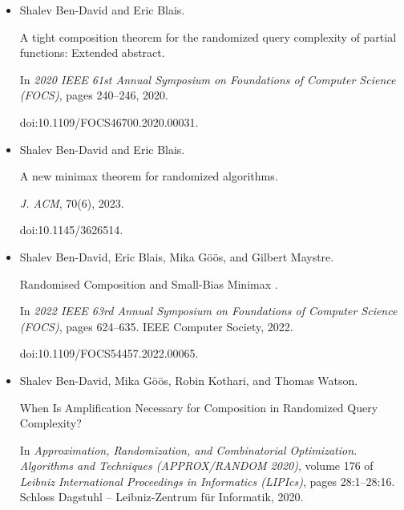 \documentclass[10pt,a4paper]{article}
\begin{document}
\begin{itemize}
In \emph{14th Innovations in Theoretical Computer Science Conference
(ITCS 2023)}, volume 251 of \emph{Leibniz International Proceedings in
Informatics (LIPIcs)}, pages 14:1–14:17. Schloss Dagstuhl – Leibniz-Zentrum
für Informatik, 2023.


doi:10.4230/LIPIcs.ITCS.2023.14.





\item[] 
[6]

Shalev Ben-David and Eric Blais.


A tight composition theorem for the randomized query complexity of
partial functions: Extended abstract.


In \emph{2020 IEEE 61st Annual Symposium on Foundations of Computer
Science (FOCS)}, pages 240–246, 2020.


doi:10.1109/FOCS46700.2020.00031.





\item[] 
[7]

Shalev Ben-David and Eric Blais.


A new minimax theorem for randomized algorithms.


\emph{J. ACM}, 70(6), 2023.


doi:10.1145/3626514.





\item[] 
[8]

Shalev Ben-David, Eric Blais, Mika Göös, and Gilbert Maystre.


 Randomised Composition and Small-Bias Minimax .


In \emph{2022 IEEE 63rd Annual Symposium on Foundations of Computer
Science (FOCS)}, pages 624–635. IEEE Computer Society, 2022.


doi:10.1109/FOCS54457.2022.00065.





\item[] 
[9]

Shalev Ben-David, Mika Göös, Robin Kothari, and Thomas Watson.


When Is Amplification Necessary for Composition in Randomized Query
Complexity?


In \emph{Approximation, Randomization, and Combinatorial Optimization.
Algorithms and Techniques (APPROX/RANDOM 2020)}, volume 176 of \emph{Leibniz
International Proceedings in Informatics (LIPIcs)}, pages 28:1–28:16.
Schloss Dagstuhl – Leibniz-Zentrum für Informatik, 2020.



\end{itemize}
\end{document}
